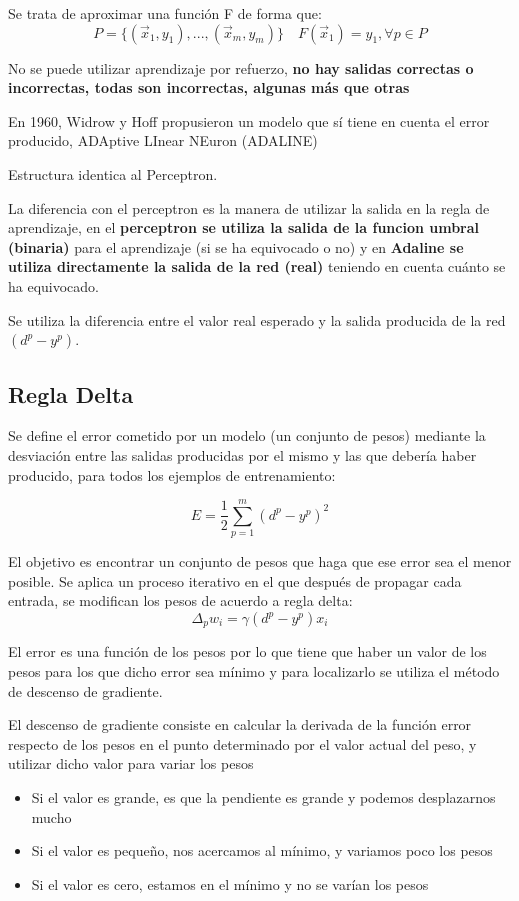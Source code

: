 \documentclass[12pt, twoside, openright]{report} %
\begin{document}
Se trata de aproximar una función F de forma que:
$$P=\{(\vec{x}_1, y_1), ...,(\vec{x}_m, y_m)\} \quad F(\vec{x}_1)=y_1, \forall p \in P$$

No se puede utilizar aprendizaje por refuerzo, \textbf{no hay salidas correctas o incorrectas, todas son incorrectas, algunas más que otras}

En 1960, Widrow y Hoff propusieron un modelo que sí tiene en cuenta el error producido, ADAptive LInear NEuron (ADALINE)

Estructura identica al Perceptron.

La diferencia con el perceptron es la manera de utilizar la salida en la regla de aprendizaje, en el \textbf{perceptron se utiliza la salida de la funcion umbral (binaria)} para el aprendizaje (si se ha equivocado o no) y en \textbf{Adaline se utiliza directamente la salida de la red (real)} teniendo en cuenta cuánto se ha equivocado.

Se utiliza la diferencia entre el valor real esperado y la salida producida de la red $(d^p-y^p)$.

\subsection{Regla Delta}
Se define el error cometido por un modelo (un conjunto de pesos) mediante la desviación entre las salidas producidas por el mismo y las que debería haber producido, para todos los ejemplos de entrenamiento:

$$E=\frac 1 2 \sum_{p=1}^m(d^p-y^p)^2$$

El objetivo es encontrar un conjunto de pesos que haga que ese error sea el menor posible. Se aplica un proceso iterativo en el que después de propagar cada entrada, se modifican los pesos de acuerdo a regla delta:
$$\Delta_pw_i=\gamma(d^p-y^p)x_i$$

El error es una función de los pesos por lo que tiene que haber un valor de los pesos para los que dicho error sea mínimo y para localizarlo se utiliza el método de descenso de gradiente.

El descenso de gradiente consiste en calcular la derivada de la función error respecto de los pesos en el punto determinado por el valor actual del peso, y utilizar dicho valor para variar los pesos
\begin{itemize}
	\item Si el valor es grande, es que la pendiente es grande y podemos desplazarnos mucho
	\item Si el valor es pequeño, nos acercamos al mínimo, y variamos poco los pesos
	\item Si el valor es cero, estamos en el mínimo y no se varían los pesos
\end{itemize}
\end{document}
